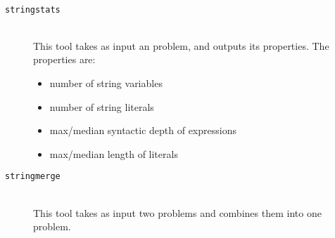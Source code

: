 \begin{description}
            \hfill \\

        \item[\texttt{stringstats}] \hfill \\
            This tool takes as input an \smt{} problem, and outputs its properties. The properties are:

            \begin{itemize}
                \item number of string variables
                \item number of string literals
                \item max/median syntactic depth of expressions
                \item max/median length of literals
            \end{itemize}

            \hfill

        \item[\texttt{stringmerge}] \hfill \\
            This tool takes as input two \smt{} problems and combines them into one problem.


    \end{description}
